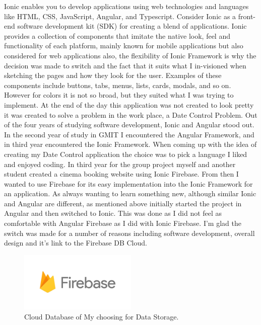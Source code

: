 Ionic enables you to develop applications using web technologies and languages like HTML, CSS, JavaScript, Angular, and Typescript. Consider Ionic as a front-end software development kit (SDK) for creating a blend of applications. Ionic provides a collection of components that imitate the native look, feel and functionality of each platform, mainly known for mobile applications but also considered for web applications also, the flexibility of Ionic Framework is why the decision was made to switch and the fact that  it suits what I in-visioned when sketching the pages and how they look for the user. Examples of these components include buttons, tabs, menus, lists, cards, modals, and so on. However for colors it is not so broad, but they suited what I was trying to implement. At the end of the day this application was not created to look pretty it was created to solve a problem in the work place, a Date Control Problem.
\newline
\newpage
Out of the four years of studying software development, Ionic and Angular stood out. In the second year of study in GMIT I encountered the Angular Framework, and in third year encountered the Ionic Framework. When coming up with the idea of creating my Date Control application the choice was to pick a language I liked and enjoyed coding. In third year for the group project myself and another student created a cinema booking website using Ionic Firebase. From then I wanted to use Firebase for its easy implementation into the Ionic Framework for an application. As always wanting to learn something new, although similar Ionic and Angular are different, as mentioned above initially started the project in Angular and then switched to Ionic. This was done as I did not feel as comfortable with Angular Firebase as I did with Ionic Firebase. I'm glad the switch was made for a number of reasons including software development, overall design and it's link to the Firebase DB Cloud.
\newline

\begin{figure}[h!]
	\caption{Cloud Database of My choosing for Data Storage.}
	\label{image:fire-base}
	\centering
	\includegraphics[width=0.5\textwidth]{images/fire-base.png}
\end{figure}

